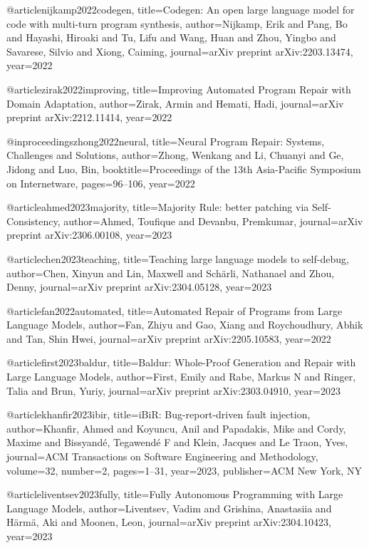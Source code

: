 @article{nijkamp2022codegen,
  title={Codegen: An open large language model for code with multi-turn program synthesis},
  author={Nijkamp, Erik and Pang, Bo and Hayashi, Hiroaki and Tu, Lifu and Wang, Huan and Zhou, Yingbo and Savarese, Silvio and Xiong, Caiming},
  journal={arXiv preprint arXiv:2203.13474},
  year={2022}
}

@article{zirak2022improving,
  title={Improving Automated Program Repair with Domain Adaptation},
  author={Zirak, Armin and Hemati, Hadi},
  journal={arXiv preprint arXiv:2212.11414},
  year={2022}
}

@inproceedings{zhong2022neural,
  title={Neural Program Repair: Systems, Challenges and Solutions},
  author={Zhong, Wenkang and Li, Chuanyi and Ge, Jidong and Luo, Bin},
  booktitle={Proceedings of the 13th Asia-Pacific Symposium on Internetware},
  pages={96--106},
  year={2022}
}

@article{ahmed2023majority,
  title={Majority Rule: better patching via Self-Consistency},
  author={Ahmed, Toufique and Devanbu, Premkumar},
  journal={arXiv preprint arXiv:2306.00108},
  year={2023}
}


@article{chen2023teaching,
  title={Teaching large language models to self-debug},
  author={Chen, Xinyun and Lin, Maxwell and Sch{\"a}rli, Nathanael and Zhou, Denny},
  journal={arXiv preprint arXiv:2304.05128},
  year={2023}
}

@article{fan2022automated,
  title={Automated Repair of Programs from Large Language Models},
  author={Fan, Zhiyu and Gao, Xiang and Roychoudhury, Abhik and Tan, Shin Hwei},
  journal={arXiv preprint arXiv:2205.10583},
  year={2022}
}

@article{first2023baldur,
  title={Baldur: Whole-Proof Generation and Repair with Large Language Models},
  author={First, Emily and Rabe, Markus N and Ringer, Talia and Brun, Yuriy},
  journal={arXiv preprint arXiv:2303.04910},
  year={2023}
}

@article{khanfir2023ibir,
  title={iBiR: Bug-report-driven fault injection},
  author={Khanfir, Ahmed and Koyuncu, Anil and Papadakis, Mike and Cordy, Maxime and Bissyand{\'e}, Tegawend{\'e} F and Klein, Jacques and Le Traon, Yves},
  journal={ACM Transactions on Software Engineering and Methodology},
  volume={32},
  number={2},
  pages={1--31},
  year={2023},
  publisher={ACM New York, NY}
}

@article{liventsev2023fully,
  title={Fully Autonomous Programming with Large Language Models},
  author={Liventsev, Vadim and Grishina, Anastasiia and H{\"a}rm{\"a}, Aki and Moonen, Leon},
  journal={arXiv preprint arXiv:2304.10423},
  year={2023}
}

